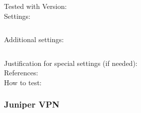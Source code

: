 \begin{description}
\item[Tested with Version:] 

\item[Settings:] \mbox{}

\begin{lstlisting}[breaklines]
    %Here goes your setting string
\end{lstlisting}

\item[Additional settings:] \mbox{}


\begin{lstlisting}[breaklines]
    %copy \& paste additional settings
\end{lstlisting}

\item[Justification for special settings (if needed):] \mbox{}


\item[References:] 


\item[How to test:] 

\end{description}







\subsubsection{Juniper VPN}


